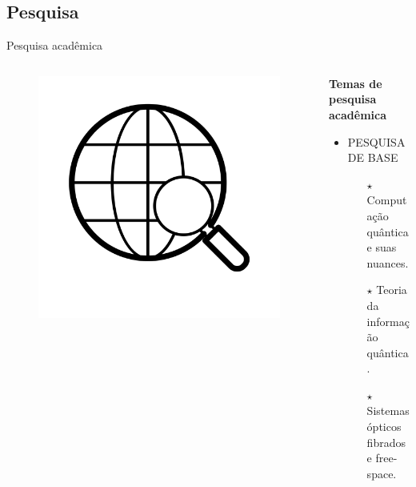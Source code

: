 \documentclass{beamer}
\begin{document}
\subsection{Pesquisa}
\begin{frame}{Pesquisa acadêmica}
    \begin{columns}[T] %
        \begin{column}{.1\textwidth}
            \begin{figure}[h!]
                \centering
                \includegraphics[scale=0.2]{pesq.png}
            \end{figure}
        \end{column}%
        \hfill%
        \hspace{0.2cm}
        \begin{column}{.85\textwidth}
            \textbf{Temas de pesquisa acadêmica}
            \begin{itemize}
                \item<1-> [+] PESQUISA DE BASE 
                \begin{itemize}
                    \item [$\star$] Computação quântica e suas nuances.
                    \item [$\star$] Teoria da informação quântica.
                    \item [$\star$] Sistemas ópticos fibrados e free-space.

\end{itemize}
\end{itemize}
\end{column}
\end{columns}
\end{frame}
\end{document}
